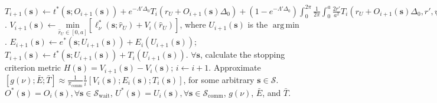 \documentclass[12pt, draftcls, onecolumn]{IEEEtran}
\theoremstyle{plain}
\theoremstyle{definition}
\theoremstyle{remark}
\DeclareMathOperator*{\argmin}{arg\,min}
\begin{document}
\begin{algorithm}[t]
\begin{algorithmic}[1]
        		\vspace{0.1cm}
        		\State $T_{i{+}1}(\mathbf{s}){\gets}t^{*}(\mathbf{s};O_{i{+}1}(\mathbf{s})){+}e^{-\Lambda'\Delta_{0}}T_{i}(r_{U}{+}O_{i{+}1}(\mathbf{s})\Delta_{0}){+}\left(1{-}e^{-\Lambda'\Delta_{0}}\right)\int_{0}^{2\pi}\frac{1}{2\pi}\int_{0}^{a}\frac{2r'}{a^{2}}T_{i}(r_{U}{+}O_{i{+}1}(\mathbf{s})\Delta_{0},r',\psi')\mathrm{d}r'\mathrm{d}\psi'$.
        		\vspace{0.1cm}
        	\EndFor
        	\vspace{0.1cm}
        	    \vspace{0.1cm}
        		\State $V_{i{+}1}(\mathbf{s}){\gets}\underset{\hat{r}_{U}{\in}[0,a]}{\mathrm{min}}\left[\ell_{\nu}^{*}(\mathbf{s};\hat{r}_{U}){+}V_{i}(\hat{r}_{U})\right]$, where $U_{i{+}1}(\mathbf{s})$ is the $\argmin$.
        		\vspace{0.1cm}
        		\State $E_{i{+}1}(\mathbf{s}){\gets}e^{*}(\mathbf{s};U_{i{+}1}(\mathbf{s})){+}E_{i}(U_{i{+}1}(\mathbf{s}))$; $T_{i{+}1}(\mathbf{s}){\gets}t^{*}(\mathbf{s};U_{i{+}1}(\mathbf{s})){+}T_{i}(U_{i{+}1}(\mathbf{s}))$.
        		\vspace{0.1cm}
        	\EndFor
        	\vspace{0.1cm}
        	\State ${\forall}\mathbf{s}$, calculate the stopping criterion metric $H(\mathbf{s}){=}V_{i{+}1}(\mathbf{s}){-}V_{i}(\mathbf{s})$; $i{\gets}i{+}1$.
        	\vspace{0.1cm}
    \vspace{0.1cm}
    \State Approximate $\left[g(\nu);\bar{E};\bar{T}\right]{\approx}\frac{1}{\pi_{\mathrm{comm}}}\frac{1}{i}\left[V_{i}(\mathbf{s});E_{i}(\mathbf{s});T_{i}(\mathbf{s})\right]$, for some arbitrary $\mathbf{s}{\in}\mathcal{S}$.
    \vspace{0.1cm}\\
    \Return $O^{*}(\mathbf{s})=O_{i}(\mathbf{s}),{\forall}\mathbf{s}{\in}\mathcal{S}_{\mathrm{wait}}$, $U^{*}(\mathbf{s}){=}U_{i}(\mathbf{s}),{\forall}\mathbf{s}{\in} \mathcal{S}_{\mathrm{comm}}$, $g(\nu)$, $\bar{E}$, and $\bar{T}$.
    \end{algorithmic}
\end{algorithm}
\end{document}
